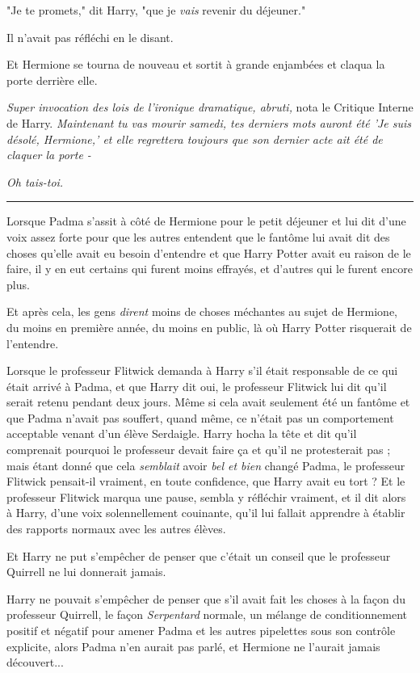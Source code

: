 "Je te promets," dit Harry, "que je \emph{vais}  revenir du déjeuner."

Il n'avait pas réfléchi en le disant.

Et Hermione se tourna de nouveau et sortit à grande enjambées et claqua la porte derrière elle.

\emph{Super invocation des lois de l'ironique dramatique, abruti, } nota le Critique Interne de Harry. \emph{Maintenant tu vas mourir samedi, tes derniers mots auront été 'Je suis désolé, Hermione,' et elle regrettera toujours que son dernier acte ait été de claquer la porte -} 

\emph{Oh tais-toi.} 
\par\noindent\rule{\textwidth}{0.4pt}
Lorsque Padma s'assit à côté de Hermione pour le petit déjeuner et lui dit d'une voix assez forte pour que les autres entendent que le fantôme lui avait dit des choses qu'elle avait eu besoin d'entendre et que Harry Potter avait eu raison de le faire, il y en eut certains qui furent moins effrayés, et d'autres qui le furent encore plus.

Et après cela, les gens \emph{dirent}  moins de choses méchantes au sujet de Hermione, du moins en première année, du moins en public, là où Harry Potter risquerait de l'entendre.

Lorsque le professeur Flitwick demanda à Harry s'il était responsable de ce qui était arrivé à Padma, et que Harry dit oui, le professeur Flitwick lui dit qu'il serait retenu pendant deux jours. Même si cela avait seulement été un fantôme et que Padma n'avait pas souffert, quand même, ce n'était pas un comportement acceptable venant d'un élève Serdaigle. Harry hocha la tête et dit qu'il comprenait pourquoi le professeur devait faire ça et qu'il ne protesterait pas ; mais étant donné que cela \emph{semblait } avoir \emph{bel et bien}  changé Padma, le professeur Flitwick pensait-il vraiment, en toute confidence, que Harry avait eu tort ? Et le professeur Flitwick marqua une pause, sembla y réfléchir vraiment, et il dit alors à Harry, d'une voix solennellement couinante, qu'il lui fallait apprendre à établir des rapports normaux avec les autres élèves.

Et Harry ne put s'empêcher de penser que c'était un conseil que le professeur Quirrell ne lui donnerait jamais.

Harry ne pouvait s'empêcher de penser que s'il avait fait les choses à la façon du professeur Quirrell, le façon \emph{Serpentard}  normale, un mélange de conditionnement positif et négatif pour amener Padma et les autres pipelettes sous son contrôle explicite, alors Padma n'en aurait pas parlé, et Hermione ne l'aurait jamais découvert...

